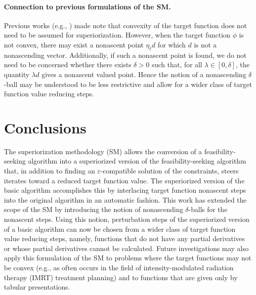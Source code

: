 \documentclass[smallextended]{svjour3}      %
\begin{document}
\paragraph{\textbf {Connection to previous formulations of the SM}.}

Previous works (e.g., \cite{herman2012superiorization}) made note that convexity of the target function does not need to be assumed for superiorization. However, when the target function $\phi$ is not convex, there may exist a nonascent point $\eta_{\ell}d$ for which $d$ is not a nonascending vector. Additionally, if such a nonascent point is found, we do not need to be concerned whether there exists $\delta>0$ such that, for all $\lambda\in[0,\delta]$, the quantity $\lambda d$ gives a nonascent valued point. Hence the notion of a nonascending $\delta$-ball may be understood to be less restrictive and allow for a wider class of target function value reducing steps.

\section{Conclusions} \label{sec:Conclusions}

The superiorization methodology (SM) allows the conversion of a feasibility-seeking algorithm into a superiorized version of the  feasibility-seeking algorithm that, in addition to finding an $\varepsilon$-compatible solution of the constraints, steers iterates toward a reduced target function value. The superiorized version of the basic algorithm accomplishes this by interlacing target function nonascent steps into the original algorithm in an automatic fashion. This work has extended the scope of the SM by introducing the notion of nonascending $\delta$-balls for the nonascent steps. Using this notion, perturbation steps of the superiorized version of a basic algorithm can now be chosen from a wider class of target function value reducing steps, namely, functions that do not have any partial derivatives or whose partial derivatives cannot be calculated. Future investigations may also apply this formulation of the SM to problems where the target functions may not be convex (e.g., as often occurs in the field of intensity-modulated radiation therapy (IMRT) treatment planning) and to functions that are given only by tabular presentations.
\end{document}
